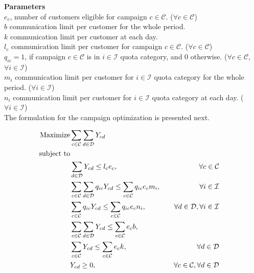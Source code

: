 \documentclass[11pt]{article}
\begin{document}
\noindent \textbf{Parameters}\\

\noindent $e_{c}$, number of customers eligible for campaign $c \in \mathcal{C}$.
($\forall c \in \mathcal{C}$)\\

\noindent $b$ communication limit per customer for the whole period.\\

\noindent $k$ communication limit per customer at each day.\\

\noindent $l_{c}$ communication limit per customer for campaign $c \in \mathcal{C}$.
($\forall c \in \mathcal{C}$)\\

\noindent $q_{{i}{c}}=1$, if campaign $c \in \mathcal{C}$ is in $i \in \mathcal{I}$ quota category, and 0 otherwise.
($\forall c \in \mathcal{C}$, $\forall i \in \mathcal{I}$)\\

\noindent $m_{i}$ communication limit per customer for $i \in \mathcal{I}$ quota category for the whole period.
($\forall i \in \mathcal{I}$)\\

\noindent $n_{i}$ communication limit per customer for $i \in \mathcal{I}$ quota category at each day.
($\forall i \in \mathcal{I}$)\\

\noindent The formulation for the campaign optimization is presented next.

\begin{align}
\text{Maximize} & \displaystyle
\sum\limits_{c\in \mathcal{C}}
\sum\limits_{d\in \mathcal{D}}
Y_{{c}{d}} \label{mathmodel2_obj}&
\\
\text{subject to} \notag\\
&\sum\limits_{d\in\mathcal{D}}Y_{{c}{d}} \leq l_{c}  e_{c}, &&&\forall c \in \mathcal{C} \label{mathmodel2_campaignlimit}&\\
&\sum\limits_{c\in\mathcal{C}}\sum\limits_{d\in\mathcal{D}} q_{{i}{c}} Y_{{c}{d}}\leq \sum\limits_{c\in\mathcal{C}}q_{{i}{c}} e_{c}  m_{i}, &&&\forall i \in \mathcal{I} \label{mathmodel2_weeklyquotalimit}&\\
&\sum\limits_{c\in\mathcal{C}}q_{{i}{c}} Y_{{c}{d}} \leq \sum\limits_{c\in\mathcal{C}}q_{{i}{c}} e_{c} n_{i}, &&&\forall d \in \mathcal{D}, \forall i \in \mathcal{I} \label{mathmodel2_dailyquotalimit}&\\
&\sum\limits_{c\in\mathcal{C}}\sum\limits_{d\in\mathcal{D}}Y_{{c}{d}} \leq \sum\limits_{c\in\mathcal{C}}e_{c}  b, \label{mathmodel2_weeklylimit}&\\
&\sum\limits_{c\in\mathcal{C}}Y_{{c}{d}} \leq \sum\limits_{c\in\mathcal{C}}e_{c} k, &&&\forall d \in \mathcal{D}\label{mathmodel2_dailylimit}&\\
&Y_{{c}{d}} \geq 0,&&&\forall c \in \mathcal{C}, \forall d \in \mathcal{D} \label{mathmodel2_positive}
\end{align}\\
\end{document}

